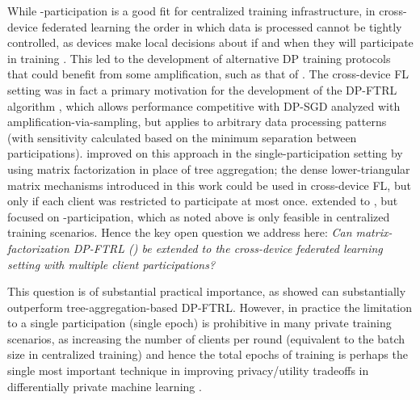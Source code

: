 
While \multiepoch-participation is a good fit for centralized training infrastructure, in cross-device federated learning the order in which data is processed cannot be tightly controlled, as devices make local decisions about if and when they will participate in training \citep{FLO,bonawitz2019towards}. This led to the development of alternative DP training protocols that could benefit from some amplification, such as that of \citet{balle2020privacy}. The cross-device FL setting was in fact a primary motivation for the development of the DP-FTRL algorithm \citep{kairouz2021practical}, which allows performance competitive with DP-SGD analyzed with amplification-via-sampling, but applies to arbitrary data processing patterns (with sensitivity calculated based on the minimum separation between participations).  \citet{denisov22matfact} improved on this approach in the single-participation setting by using matrix factorization in place of tree aggregation; the dense lower-triangular matrix mechanisms introduced in this work could be used in cross-device FL, but only if each client was restricted to participate at most once.  \citet{choquette22multiepoch} extended to \citet{denisov22matfact}, but focused on \multiepoch-participation, which as noted above is only feasible in centralized training scenarios. Hence the key open question we address here: \emph{Can matrix-factorization DP-FTRL (\MFFTRL) be extended to the cross-device federated learning setting with multiple client participations?} 

This question is of substantial practical importance, as \citet{choquette22multiepoch} showed \MFFTRL can substantially outperform tree-aggregation-based DP-FTRL. However, in practice the limitation to a single participation (single epoch) is prohibitive in many private training scenarios, as increasing the number of clients per round (equivalent to the batch size in centralized training) and hence the total epochs of training is perhaps the single most important technique in improving privacy/utility tradeoffs in differentially private machine learning \citep{ponomareva2023dpfy}.

